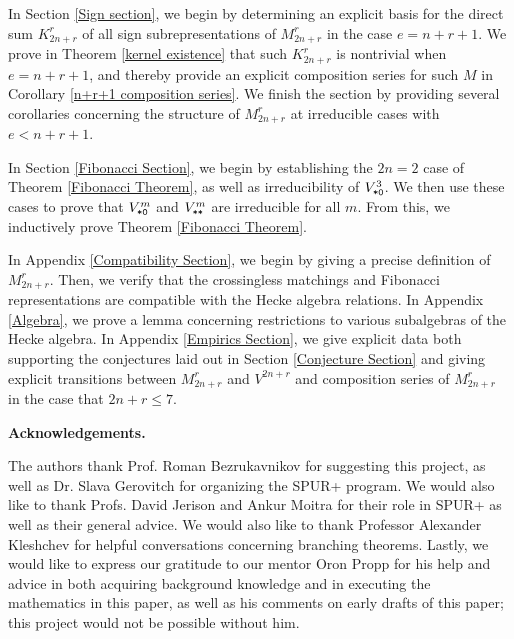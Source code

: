 \documentclass{amsart}
\newcommand{\fakesubsection}[1]{
    \vspace{7pt}
    \noindent \textbf{#1.}
  }
\begin{document}
  \vspace{5pt}
  In Section \ref{Sign section}, we begin by determining an explicit basis for the direct sum $K_{2n + r}^r$ of all sign subrepresentations of $M_{2n + r}^r$ in the case $e = n + r + 1$.
  We prove in Theorem \ref{kernel existence} that such $K_{2n + r}^r$ is nontrivial when $e = n + r + 1$, and thereby provide an explicit composition series for such $M$ in Corollary \ref{n+r+1 composition series}.
  We finish the section by providing several corollaries concerning the structure of $M_{2n + r}^r$ at irreducible cases with $e < n + r + 1$.

  \vspace{5pt}
  In Section \ref{Fibonacci Section}, we begin by establishing the $2n = 2$ case of Theorem \ref{Fibonacci Theorem}, as well as irreducibility of $V^3_{\texttt{*}\texttt{0}}$.
  We then use these cases to prove that $V^m_{\texttt{*}\texttt{0}}$ and $V^m_{\texttt{*}\texttt{*}}$ are irreducible for all $m$.
  From this, we inductively prove Theorem \ref{Fibonacci Theorem}.

  \vspace{5pt}
  In Appendix \ref{Compatibility Section}, we begin by giving a precise definition of $M_{2n + r}^r$.
  Then, we verify that the crossingless matchings and Fibonacci representations are compatible with the Hecke algebra relations.
  In Appendix \ref{Algebra}, we prove a lemma concerning restrictions to various subalgebras of the Hecke algebra.
  In Appendix \ref{Empirics Section}, we give explicit data both supporting the conjectures laid out in Section \ref{Conjecture Section} and giving explicit transitions between $M_{2n + r}^r$ and $V^{2n + r}$ and composition series of $M_{2n + r}^r$ in the case that $2n + r \leq 7$.

  \fakesubsection{Acknowledgements}
  The authors thank Prof. Roman Bezrukavnikov for suggesting this project, as well as Dr. Slava Gerovitch for organizing the SPUR+ program.
  We would also like to thank Profs. David Jerison and Ankur Moitra for their role in SPUR+ as well as their general advice.
  We would also like to thank Professor Alexander Kleshchev for helpful conversations concerning branching theorems.
  Lastly, we would like to express our gratitude to our mentor Oron Propp for his help and advice in both acquiring background knowledge and in executing the mathematics in this paper, as well as his comments on early drafts of this paper;
  this project would not be possible without him.
   
\end{document}
